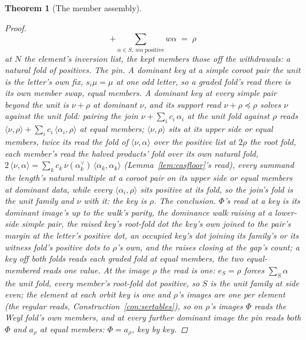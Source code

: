 \documentclass[11pt]{article}
\newtheorem{theorem}{Theorem}
\theoremstyle{definition}
\begin{document}
\begin{theorem}[The member assembly]
\begin{proof}
\[+\sum_{\alpha\in S,\ w\alpha\ \mathrm{positive}}w\alpha\;=\;\rho
\]
at $N$ the element's inversion list, the kept members those off
the withdrawals: a natural fold of positives.
\emph{The pin.} A dominant key at a simple coroot pair the unit
is the letter's own fix, $s_i\mu=\mu$ at one odd letter, so a
graded fold's read there is its own member swap, equal members.
A dominant key at every simple pair beyond the unit is $\nu+\rho$
at dominant $\nu$, and its support read $\nu+\rho\preceq\rho$
solves $\nu$ against the unit fold: pairing the join
$\nu+\sum_ic_i\,\alpha_i$ at the unit fold against $\rho$ reads
$\langle\nu,\rho\rangle+\sum_ic_i\,\langle\alpha_i,\rho\rangle$ at
equal members; $\langle\nu,\rho\rangle$ sits at its upper side or
equal members, twice its read the fold of $\langle\nu,\alpha\rangle$
over the positive list at $2\rho$ the root fold, each member's read
the halved products' fold over its own natural fold,
$2\,\langle\nu,\alpha\rangle=\sum_kc_k\,\nu(\alpha_k^\vee)\,
\langle\alpha_k,\alpha_k\rangle$ (Lemma~\ref{lem:casfloor}'s read),
every summand the length's natural multiple at a coroot pair on its
upper side or equal members at dominant data, while
every $\langle\alpha_i,\rho\rangle$ sits positive at its fold, so
the join's fold is the unit family and $\nu$ with it: the key is
$\rho$.
\emph{The conclusion.} $\Phi$'s read at a key is its dominant
image's up to the walk's parity, the dominance walk raising at a
lower-side simple pair, the raised key's root-fold dot the key's
own joined to the pair's margin at the letter's positive dot, an
occupied key's dot joining its family's or its witness fold's
positive dots to $\rho$'s own, and the raises closing at the
gap's count; a key off both folds reads each graded fold at equal
members, the two equal-membered reads one value. At the
image $\rho$ the read is one:
$e_S=\rho$ forces $\sum_{S}\alpha$ the unit fold, every member's
root-fold dot positive, so $S$ is the unit family at side even;
the element at each orbit key is one and $\rho$'s images are one
per element (the regular reads,
Construction~\ref{con:sertables}), so on $\rho$'s images $\Phi$
reads the Weyl fold's own members, and at every further dominant
image the pin reads both $\Phi$ and $a_\rho$ at equal members:
$\Phi=a_\rho$, key by key.
\end{proof}
\end{theorem}
\end{document}
